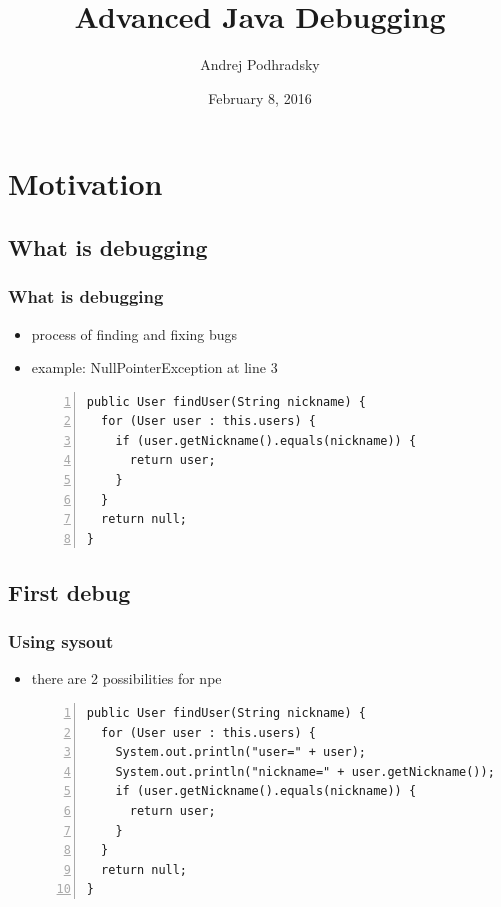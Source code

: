 \documentclass{beamer}
\begin{document}
\title{Advanced Java Debugging}   
\author{Andrej Podhradsky}
\date{February 8, 2016} 



\frame{\titlepage} 


\section{Motivation}

\subsection{What is debugging}
\begin{frame}[fragile]
\frametitle{What is debugging}
\begin{itemize}
\item process of finding and fixing bugs
\item example: NullPointerException at line 3
\vspace{0.2cm}
\begin{lstlisting}[numbers=left]
public User findUser(String nickname) {
  for (User user : this.users) {
    if (user.getNickname().equals(nickname)) {
      return user;
    }
  }
  return null;
}
\end{lstlisting}
\end{itemize}
\end{frame}


\subsection{First debug}
\begin{frame}[fragile]
\frametitle{Using sysout}
\begin{itemize}
\item there are 2 possibilities for npe
\vspace{0.2cm}
\begin{lstlisting}[numbers=left]
public User findUser(String nickname) {
  for (User user : this.users) {
    System.out.println("user=" + user);
    System.out.println("nickname=" + user.getNickname());
    if (user.getNickname().equals(nickname)) {
      return user;
    }
  }
  return null;
}
\end{lstlisting}
\end{itemize}
\end{frame}
\end{document}
